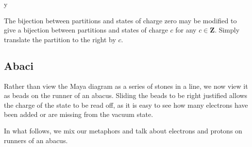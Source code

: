 y\documentclass{amsart}[12pt]
\theoremstyle{definition}
\newcommand{\Z}{\mathbf{Z}}
\begin{document}
The bijection between partitions and states of charge zero may be
modified to give a bijection between partitions and states of charge $c$ for any $c\in\Z$.   Simply translate the partition to the right by $c$.



\subsection{Abaci}

Rather than view the Maya diagram as a series of stones in a line, we
now view it as beads on the runner of an abacus.  Sliding the beads
to be right justified allows the charge of the state to be read off,
as it is easy to see how many electrons have been added or are missing
from the vacuum state.

In what follows, we mix our metaphors and talk about electrons and protons on runners of an abacus.
\end{document}
